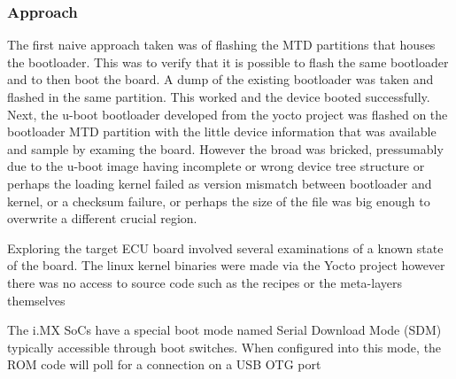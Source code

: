 
\subsubsection*{Approach}

The first naive approach taken was of flashing the MTD partitions that houses the bootloader. This was to verify that it is possible to flash the same bootloader and to then boot the board. A dump of the existing bootloader was taken and flashed in the same partition. This worked and the device booted successfully. Next, the u-boot bootloader developed from the yocto project was flashed on the bootloader MTD partition with the little device information that was available and sample by examing the board. However the broad was bricked, pressumably due to the u-boot image having incomplete or wrong device tree structure or perhaps the loading kernel failed as version mismatch between bootloader and kernel, or a checksum failure, or perhaps the size of the file was big enough to overwrite a different crucial region.



Exploring the target ECU board involved several examinations of a known state of the board. The linux kernel binaries were made via the Yocto project however there was no access to source code such as the recipes or the meta-layers themselves

The i.MX SoCs have a special boot mode named Serial Download Mode (SDM) typically accessible through boot switches. When configured into this mode, the ROM code will poll for a connection on a USB OTG port
